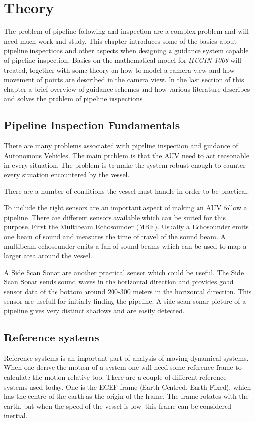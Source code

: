 \chapter{Theory}
	The problem of pipeline following and inspection are a complex problem and will need much work and
	study. This chapter introduces some of the basics about pipeline inspections and other aspects when
	designing a guidance system capable of pipeline inspection. Basics on the mathematical model for
	\textit{ḨUGIN 1000} will treated, together with some theory on how to model a camera view and how
	movement of points are described in the camera view. In the last section of this chapter a brief
	overview of guidance schemes and how various literature describes and solves the problem of pipeline
	inspections.

\section{Pipeline Inspection Fundamentals}
	There are many problems associated with pipeline inspection and guidance of Autonomous Vehicles. The
	main problem is that the AUV need to act reasonable in every situation. The problem is to make the
	system robust enough to counter every situation encountered by the vessel. 

	There are a number of conditions the vessel must handle in order to be practical.
	
	To include the right sensors are an important aspect of making an AUV follow a pipeline. There are
	different sensors available which can be suited for this purpose. First the Multibeam Echosounder
	(MBE). Usually a Echosounder emits one beam of sound and measures the time of travel of the sound
	beam. A multibeam echosounder emits a fan of sound beams which can be used to map a larger area around
	the vessel.

	A Side Scan Sonar are another practical sensor which could be useful. The Side Scan Sonar sends sound
	waves in the horizontal direction and provides good sensor data of the bottom around 200-300 meters in
	the horizontal direction. This sensor are usefull for initially finding the pipeline. A side scan
	sonar picture of a pipeline gives very distinct shadows and are easily detected. 
	
\section{Reference systems}
	Reference systems is an important part of analysis of moving dynamical systems. When one derive the motion of 
	a system one will need some reference frame to calculate the motion relative too. There are a couple
of different 
	reference systems used today. One is the ECEF-frame (Earth-Centred, Earth-Fixed), which has the centre
of the 
	earth as the origin of the frame. The frame rotates with the earth, but when the speed of the vessel is low, 
	this frame can be considered inertial. \cite{gps_bok}
	
